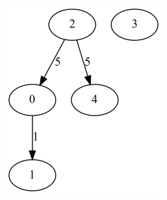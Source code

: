 \documentclass{article}
\begin{document}
\begin{figure}[!htb]
\endminipage\hfill
{}
  \includegraphics[width=\linewidth]{"./output/graph_prim_iteration_4.png"}


\end{figure}
\end{document}

